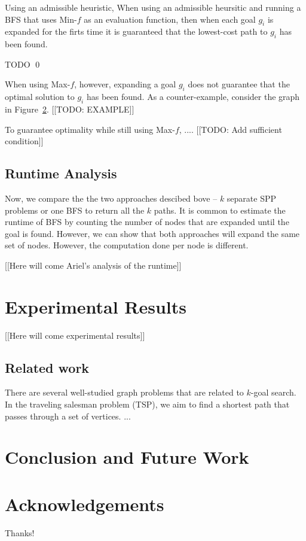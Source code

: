 \documentclass{aicom2e}
\newenvironment{proof}{\noindent{\bf Proof:~~}}{\qed}
\begin{document}
\begin{theorem}
Using an admissible heuristic, 
When using an admissible heursitic and running a BFS that uses Min-$f$ as an evaluation function,
then when each goal $g_i$ is expanded for the firts time it is guaranteed that the lowest-cost path to $g_i$ has been found. 
\label{the:min-f}
\end{theorem}
 \begin{proof}
 TODO
 \end{proof}
 
 When using Max-$f$, however, expanding a goal $g_i$ does not guarantee
 that the optimal solution to $g_i$ has been found. As a counter-example, consider 
 the graph in Figure~\ref{}.
 [[TODO: EXAMPLE]]
 
 To guarantee optimality while still using Max-$f$, ....
 [[TODO: Add sufficient condition]]

\subsection{Runtime Analysis}
Now, we compare the the two approaches descibed bove -- $k$ separate SPP problems or one BFS to return all the $k$ paths. 
It is common to estimate the runtime of BFS by counting the number of nodes that are expanded until the goal is found. However, we can show that both approaches will expand the same set of nodes.  However, the computation done per node is different. 

[[Here will come Ariel's analysis of the runtime]]




\section{Experimental Results}
[[Here will come experimental results]]

\subsection*{Related work}

There are several well-studied graph problems that are related to $k$-goal search. In the traveling salesman problem (TSP), we aim to find a shortest path that passes through a set of vertices. 
...

\section{Conclusion and Future Work}


\section*{Acknowledgements}
Thanks!



\end{document}
